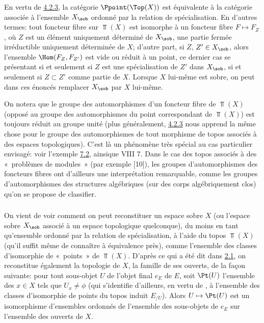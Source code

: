 \documentclass[10pt]{../fichiers-configuration-latex/smfart}
\begin{document}
\subsubsection{}
En vertu de \hyperref[IV.subsubsec4.2.3]{4.2.3}, la catégorie $\Ppoint(\Top(X))$
est équivalente à la catégorie associée à l'ensemble $X_{\sob}$
ordonné par la relation de spécialisation. En d'autres termes: tout
foncteur fibre sur $\Top(X)$ est isomorphe à un foncteur fibre
$F\mapsto F_Z$, où $Z$ est un élément uniquement déterminé de
$X_{\sob}$, \ie une partie fermée irréductible uniquement
déterminée
de $X$; d'autre part, si $Z$, $Z'\in X_{\sob}$, alors l'ensemble
$\Hom(F_Z,F_{Z'})$ est vide ou réduit à un point, ce dernier cas se
présentant si et seulement si $Z$ est une spécialisation de $Z'$
dans $X_{\sob}$, \ie si et seulement si $Z\subset Z'$ comme partie
de $X$. Lorsque $X$ lui-même est sobre, on peut dans ces énoncés
remplacer $X_{\sob}$ par $X$ lui-même.

On notera que le groupe des automorphismes d'un foncteur fibre de
$\Top(X)$ (opposé au groupe des automorphismes du point
correspondant de $\Top(X)$) est toujours réduit au groupe unité
(plus généralement, \hyperref[IV.subsubsec4.2.3]{4.2.3} nous apprend la même
chose pour le groupe des automorphismes de tout morphisme de topos
associés à des espaces topologiques). C'est là un phénomène très
spécial au cas particulier envisagé: voir l'exemple
\hyperref[IV.subsec7.2]{7.2}, ainsi\pageoriginale que VIII 7. Dans le cas des
topos associés à des « problèmes de modules »  (\cf par exemple
[10]), les groupes d'automorphismes des foncteurs fibres ont
d'ailleurs une interprétation remarquable, comme les groupes
d'automorphismes des structures algébriques (sur des corps
algébriquement clos) qu'on se propose de classifier.

\subsubsection{}
On vient de voir comment on peut reconstituer un espace sobre $X$
(ou l'espace sobre $X_{\sob}$ associé à un espace topologique
quelconque), du moins en tant qu'ensemble ordonné par la relation de
spécialisation, à l'aide du topos $\Top(X)$ (qu'il suffit même de
connaître à équivalence près), comme l'ensemble des classes
d'isomorphie de « points »  de $\Top(X)$. D'après ce qui a été
dit dans \hyperref[IV.subsec2.1]{2.1}, on reconstitue également la topologie
de $X$, \ie la famille de ses ouverts, de la façon suivante: pour
tout sous-objet $U$ de l'objet final $e_E$ de $E$, soit $\Pt(U)$
l'ensemble des $x\in X$ tels que $U_x\neq\phi$ (qui s'identifie
d'ailleurs, en vertu de , à l'ensemble des classes
d'isomorphie de points du topos induit $E_{/U}$). Alors $U\mapsto
\Pt(U)$ est un isomorphisme d'ensembles ordonnés de l'ensemble des
sous-objets de $e_E$ sur l'ensemble des ouverts de $X$.
\end{document}
